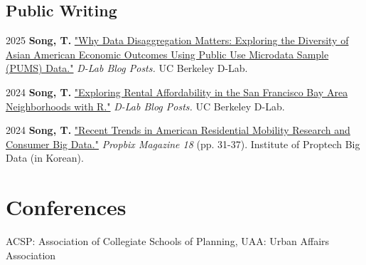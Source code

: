 \documentclass[12pt,letterpaper]{report}
\newcommand{\listitemspace}{0.4em}
\renewenvironment{itemize}
{\begin{list}{}{\setlength{\leftmargin}{0.5em}
                \setlength{\parskip}{0em}
                \setlength{\itemsep}{\listitemspace}
                \setlength{\parsep}{\listitemspace}}}
{\end{list}}
\begin{document}
    \subsection*{Public Writing}
    \begin{tablist}
    \item[2025] \tab{}\textbf{Song, T.} \href{https://medium.com/@dlab-berkeley/why-data-disaggregation-matters-exploring-the-diversity-of-asian-american-economic-outcomes-using-8b96e5dcc9a4}{"Why Data Disaggregation Matters: Exploring the Diversity of Asian American Economic Outcomes Using Public Use Microdata Sample (PUMS) Data."} \emph{D-Lab Blog Posts.} UC Berkeley D-Lab.
    \item[2024] \tab{}\textbf{Song, T.} \href{https://medium.com/@dlab-berkeley/exploring-rental-affordability-in-the-san-francisco-bay-area-neighborhoods-with-r-c4383f7553e7}{"Exploring Rental Affordability in the San Francisco Bay Area Neighborhoods with R."} \emph{D-Lab Blog Posts.} UC Berkeley D-Lab.
    \item[2024] \tab{}\textbf{Song, T.} \href{https://www.kahps.org/data/prbx/pdf_44_7}{"Recent Trends in American Residential Mobility Research and Consumer Big Data."} \emph{Propbix Magazine 18} (pp. 31-37). Institute of Proptech Big Data (in Korean).
    \end{tablist}

\section*{Conferences}
ACSP: Association of Collegiate Schools of Planning, UAA: Urban Affairs Association
\end{document}
